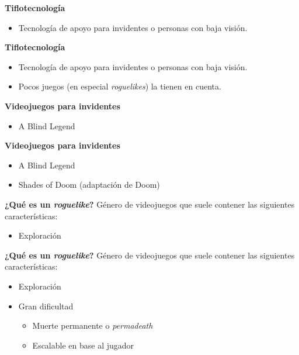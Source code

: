 \begin{tframe}{\textbf{Tiflotecnología}}
	\begin{itemize}
			\item<+-| alert@+> Tecnología de apoyo para invidentes o personas con baja visión.
	\end{itemize}
\end{tframe}

\begin{tframe}{\textbf{Tiflotecnología}}
	\begin{itemize}
			\item Tecnología de apoyo para invidentes o personas con baja visión.
			\item<+-| alert@+> Pocos juegos (en especial \textit{roguelikes}) la tienen en cuenta.
	\end{itemize}
\end{tframe}

\begin{tframe}{\textbf{Videojuegos para invidentes}}
	\begin{itemize}
			\item<+-| alert@+> A Blind Legend
	\end{itemize}
\end{tframe}

\begin{tframe}{\textbf{Videojuegos para invidentes}}
	\begin{itemize}
			\item<+-| alert@+> A Blind Legend
			\item<+-| alert@+> Shades of Doom (adaptación de Doom)
	\end{itemize}
\end{tframe}

\begin{tframe}{\textbf{¿Qué es un \textit{roguelike}?}}
	Género de videojuegos que suele contener las siguientes características:
	\begin{itemize}
		\item<+-| alert@+> Exploración
	\end{itemize}
\end{tframe}

\begin{tframe}{\textbf{¿Qué es un \textit{roguelike}?}}
	Género de videojuegos que suele contener las siguientes características:
	\begin{itemize}
		\item Exploración
		\item<+-| alert@+> Gran dificultad
			\begin{itemize}
				\item Muerte permanente o \textit{permadeath}
				\item Escalable en base al jugador
			\end{itemize}
	\end{itemize}
\end{tframe}

